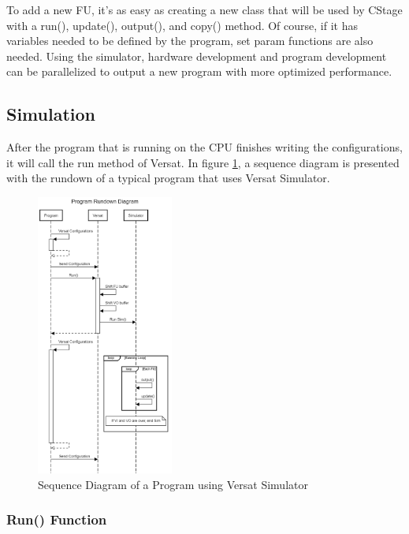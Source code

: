 \documentclass[conference]{IEEEtran}
\begin{document}
To add a new FU, it's as easy as creating a new class that will be used by CStage with
a run(), update(), output(), and copy() method. Of course, if it has variables needed to be defined
by the program, set param functions are also needed. Using the simulator, hardware development
and program development can be parallelized to output a new program 
with more optimized performance.

\subsection{Simulation}

After the program that is running on the CPU finishes writing the configurations, it will call the run method of Versat.
In figure \ref{figure:VersatSimulatorSequenceDiagram}, a sequence diagram is presented with the rundown
of a typical program that uses Versat Simulator.


\begin{figure}[!htbp]
    \centering
    \includegraphics[width=0.4\textwidth]{Figures/versatsim.png}
    \caption{Sequence Diagram of a Program using Versat Simulator}
    \label{figure:VersatSimulatorSequenceDiagram}
\end{figure} 



\subsubsection{Run() Function}
\end{document}
